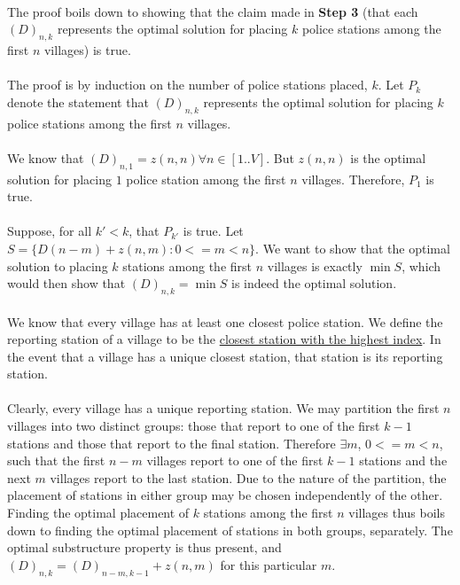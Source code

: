 \documentclass[twocolumn]{article}
\begin{document}
		\paragraph{}
		The proof boils down to showing that the claim made in \textbf{Step 3} (that each $(D)_{n, k}$ represents the optimal solution for placing $k$ police stations among the first $n$ villages) is true.
		
		\paragraph{}
		The proof is by induction on the number of police stations placed, $k$. Let $P_k$ denote the statement that $(D)_{n, k}$ represents the optimal solution for placing $k$ police stations among the first $n$ villages.
		
		\paragraph{}
		We know that $(D)_{n, 1} = z(n, n) \forall n \in [1..V]$. But $z(n, n)$ is the optimal solution for placing $1$ police station among the first $n$ villages. Therefore, $P_1$ is true.
		
		\paragraph{}
		Suppose, for all $k' < k$, that $P_{k'}$ is true. Let $S = \{D(n-m) + z(n, m) : 0 <= m < n\}$. We want to show that the optimal solution to placing $k$ stations among the first $n$ villages is exactly $\min S$, which would then show that $(D)_{n, k} = \min S$ is indeed the optimal solution.
		
		\paragraph{}
		We know that every village has at least one closest police station. We define the reporting station of a village to be the \underline{closest station with the highest index}. In the event that a village has a unique closest station, that station is its reporting station.
		
		\paragraph{}
		Clearly, every village has a unique reporting station. We may partition the first $n$ villages into two distinct groups: those that report to one of the first $k-1$ stations and those that report to the final station. Therefore $\exists m$, $0 <= m < n$, such that the first $n-m$ villages report to one of the first $k-1$ stations and the next $m$ villages report to the last station. Due to the nature of the partition, the placement of stations in either group may be chosen independently of the other. Finding the optimal placement of $k$ stations among the first $n$ villages thus boils down to finding the optimal placement of stations in both groups, separately. The optimal substructure property is thus present, and $(D)_{n, k} = (D)_{n - m, k-1} + z(n, m)$ for this particular $m$.
		
\end{document}
